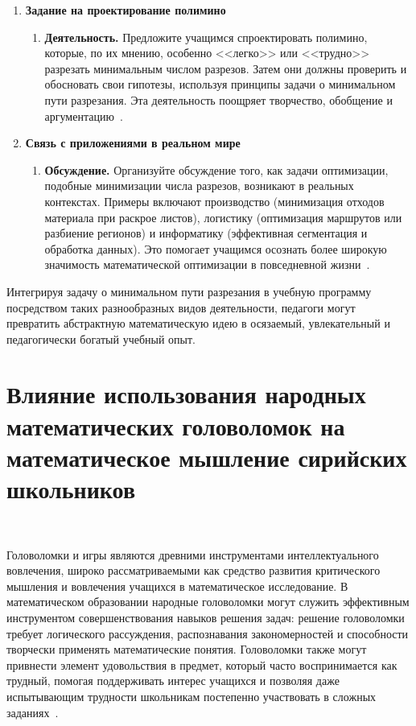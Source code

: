 \documentclass[a4paper,14pt]{extreport}
\theoremstyle{plain}
\theoremstyle{definition}
\theoremstyle{remark}
\begin{document}
\begin{enumerate}
	\item \textbf{Задание на проектирование полимино}
	\begin{enumerate}
		\item \textbf{Деятельность.} Предложите учащимся спроектировать полимино, которые, по их мнению, особенно <<легко>> или <<трудно>> разрезать минимальным числом разрезов. Затем они должны проверить и обосновать свои гипотезы, используя принципы задачи о минимальном пути разрезания. Эта деятельность поощряет творчество, обобщение и аргументацию~\cite{Pramestika}.
	\end{enumerate}
	
	\item \textbf{Связь с приложениями в реальном мире}
	\begin{enumerate}
		\item \textbf{Обсуждение.} Организуйте обсуждение того, как задачи оптимизации, подобные минимизации числа разрезов, возникают в реальных контекстах. Примеры включают производство (минимизация отходов материала при раскрое листов), логистику (оптимизация маршрутов или разбиение регионов) и информатику (эффективная сегментация и обработка данных). Это помогает учащимся осознать более широкую значимость математической оптимизации в повседневной жизни~\cite{Maryana}.
	\end{enumerate}
\end{enumerate}

Интегрируя задачу о минимальном пути разрезания в учебную программу посредством таких разнообразных видов деятельности, педагоги могут превратить абстрактную математическую идею в осязаемый, увлекательный и педагогически богатый учебный опыт.
\section{Влияние использования народных математических головоломок на математическое мышление сирийских школьников}~\label{sec4.3}

Головоломки и игры являются древними инструментами интеллектуального вовлечения, широко рассматриваемыми как средство развития критического мышления и вовлечения учащихся в математическое исследование. В математическом образовании народные головоломки могут служить эффективным инструментом совершенствования навыков решения задач: решение головоломки требует логического рассуждения, распознавания закономерностей и способности творчески применять математические понятия. Головоломки также могут привнести элемент удовольствия в предмет, который часто воспринимается как трудный, помогая поддерживать интерес учащихся и позволяя даже испытывающим трудности школьникам постепенно участвовать в сложных заданиях~\cite{Boaler}. 
\end{document}
